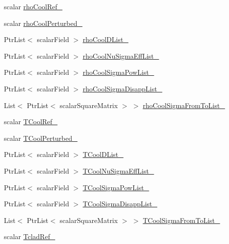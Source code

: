 \begin{DoxyCompactItemize}
\item 
scalar \hyperlink{classFoam_1_1XSLowMem_af7db5962fe92b6af73ffe43f583a75ab}{rho\+Cool\+Ref\+\_\+}
\item 
scalar \hyperlink{classFoam_1_1XSLowMem_ac789326719f83e8384cc945cbb3c57f1}{rho\+Cool\+Perturbed\+\_\+}
\item 
Ptr\+List$<$ scalar\+Field $>$ \hyperlink{classFoam_1_1XSLowMem_ae8c0f1a7dfa0b2cd3c8cc86ddde632b8}{rho\+Cool\+D\+List\+\_\+}
\item 
Ptr\+List$<$ scalar\+Field $>$ \hyperlink{classFoam_1_1XSLowMem_ad4cce6811fcdd11ab6bcb477a5f170c7}{rho\+Cool\+Nu\+Sigma\+Eff\+List\+\_\+}
\item 
Ptr\+List$<$ scalar\+Field $>$ \hyperlink{classFoam_1_1XSLowMem_a5704f26b12e1c6fb981734d71e9d22e8}{rho\+Cool\+Sigma\+Pow\+List\+\_\+}
\item 
Ptr\+List$<$ scalar\+Field $>$ \hyperlink{classFoam_1_1XSLowMem_a77db4a4d3785dae9a8ce558e973f873c}{rho\+Cool\+Sigma\+Disapp\+List\+\_\+}
\item 
List$<$ Ptr\+List$<$ scalar\+Square\+Matrix $>$ $>$ \hyperlink{classFoam_1_1XSLowMem_a7733a51d2c633e4fed22e7061659ec6b}{rho\+Cool\+Sigma\+From\+To\+List\+\_\+}
\item 
scalar \hyperlink{classFoam_1_1XSLowMem_ac3372b0ed28d321ccedf66628393b4ad}{T\+Cool\+Ref\+\_\+}
\item 
scalar \hyperlink{classFoam_1_1XSLowMem_a1850ffc8a76b1b29964c4ddf8e4d49d0}{T\+Cool\+Perturbed\+\_\+}
\item 
Ptr\+List$<$ scalar\+Field $>$ \hyperlink{classFoam_1_1XSLowMem_a7073f6cbfc582be57db1b669a666a6e6}{T\+Cool\+D\+List\+\_\+}
\item 
Ptr\+List$<$ scalar\+Field $>$ \hyperlink{classFoam_1_1XSLowMem_a4aeda1b004e53153607ab34a8535c78b}{T\+Cool\+Nu\+Sigma\+Eff\+List\+\_\+}
\item 
Ptr\+List$<$ scalar\+Field $>$ \hyperlink{classFoam_1_1XSLowMem_a1cb5f2c736e678047486275b8d30a012}{T\+Cool\+Sigma\+Pow\+List\+\_\+}
\item 
Ptr\+List$<$ scalar\+Field $>$ \hyperlink{classFoam_1_1XSLowMem_a1fbe508bbd07aa65cdb20fd850eec54a}{T\+Cool\+Sigma\+Disapp\+List\+\_\+}
\item 
List$<$ Ptr\+List$<$ scalar\+Square\+Matrix $>$ $>$ \hyperlink{classFoam_1_1XSLowMem_a399ed20b9c50c782cc7a6d4149b8911e}{T\+Cool\+Sigma\+From\+To\+List\+\_\+}
\item 
scalar \hyperlink{classFoam_1_1XSLowMem_a87e79a2257e79d89e25c61ee039d91a0}{Tclad\+Ref\+\_\+}
\item 

\end{DoxyCompactItemize}
